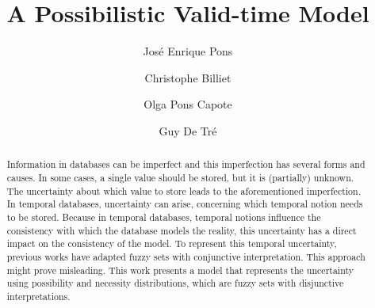 \documentclass{llncs}
\begin{document}
\mainmatter              %
%
\title{A Possibilistic Valid-time Model}
%
%
\author{Jos\'e Enrique Pons \and Christophe Billiet \and Olga Pons Capote \and Guy De Tr\'e}
%
%
%

\maketitle              %
\def\JPicScale{0.5}
\begin{abstract}
Information in databases can be imperfect and this imperfection has several forms and causes. In some cases, a single value should be stored, but it is (partially) unknown. The uncertainty about which value to store leads to the aforementioned imperfection. In temporal databases, uncertainty can arise, concerning which temporal notion needs to be stored. Because in temporal databases, temporal notions influence the consistency with which the database models the reality, this uncertainty has a direct impact on the consistency of the model. To represent this temporal uncertainty, previous works have adapted fuzzy sets with conjunctive interpretation. This approach might prove misleading. This work presents a model that represents the uncertainty using possibility and necessity distributions, which are fuzzy sets with disjunctive interpretations.
\end{abstract}
\end{document}
